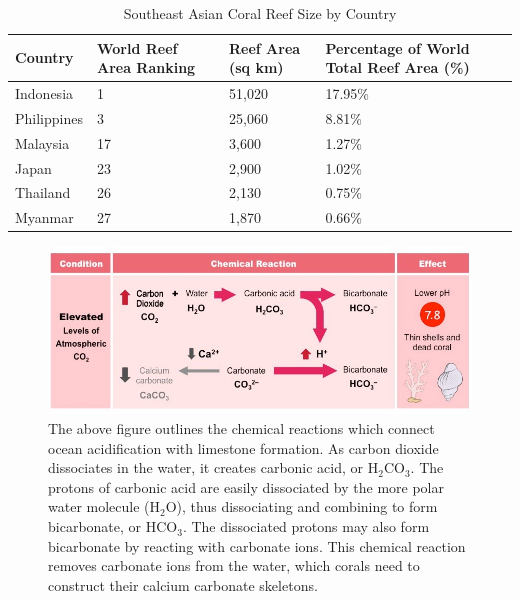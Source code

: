 \documentclass{book}\usepackage{knitr}
\begin{document}
\begin{knitrout}
\begin{kframe}
{\begin{table}[h]
\caption{Southeast Asian Coral Reef Size by Country}
\label{tab:Southeast Asian Coral Reef Size by Country}
\begin{tabular}{llll}
Country     & World Reef Area Ranking & Reef Area (sq km) & Percentage of World Total Reef Area (\%) \\ 
\hline\hline
Indonesia   & 1                       & 51,020            & 17.95\% \\ 
\hline
Philippines & 3                       & 25,060            & 8.81\%  \\ 
\hline
Malaysia    & 17                      & 3,600             & 1.27\%  \\ 
\hline
Japan       & 23                      & 2,900             & 1.02\%  \\ 
\hline
Thailand    & 26                      & 2,130             & 0.75\%  \\ 
\hline
Myanmar     & 27                      & 1,870             & 0.66\%  \\
\end{tabular}
\end{table}

\begin{figure}
\includegraphics[width=\linewidth]{images/acidification2_med}
\caption{The above figure outlines the chemical reactions which connect ocean acidification with limestone formation. As carbon dioxide dissociates in the water, it creates carbonic acid, or H$_2$CO$_3$. The protons of carbonic acid are easily dissociated by the more polar water molecule (H$_2$O), thus dissociating and combining to form bicarbonate, or HCO$_3$. The dissociated protons may also form bicarbonate by reacting with carbonate ions. This chemical reaction removes carbonate ions from the water, which corals need to construct their calcium carbonate skeletons.}
\label{fig:Ocean Acidifcation Chemical Reaction and Its Carbonate Relation}
\end{figure}

}
\end{kframe}
\end{knitrout}
\end{document}
